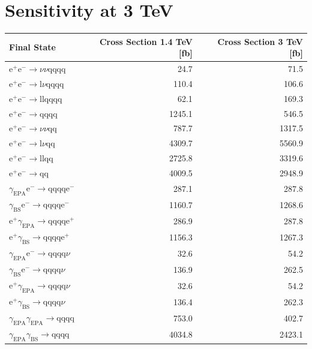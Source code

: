 \section{Sensitivity at 3 TeV}

\begin{table}[h!]
\centering
\begin{tabular}{ l r r }
\hline
Final State & Cross Section 1.4 TeV [fb] & Cross Section 3 TeV [fb]  \\ 
\hline
$\text{e}^{+}\text{e}^{-} \rightarrow \nu{\nu}\text{qqqq}$ & 24.7 & 71.5 \\
$\text{e}^{+}\text{e}^{-} \rightarrow \text{l}\nu\text{qqqq}$ & 110.4 & 106.6 \\
$\text{e}^{+}\text{e}^{-} \rightarrow \text{llqqqq}$ & 62.1 & 169.3 \\
$\text{e}^{+}\text{e}^{-} \rightarrow \text{qqqq}$ & 1245.1 & 546.5 \\
$\text{e}^{+}\text{e}^{-} \rightarrow \nu{\nu}\text{qq}$ & 787.7 & 1317.5 \\
$\text{e}^{+}\text{e}^{-} \rightarrow \text{l}\nu\text{qq}$ & 4309.7 & 5560.9 \\
$\text{e}^{+}\text{e}^{-} \rightarrow \text{llqq}$ & 2725.8 & 3319.6 \\
$\text{e}^{+}\text{e}^{-} \rightarrow \text{qq}$ & 4009.5 & 2948.9 \\
$\gamma_{\text{EPA}}\text{e}^{-} \rightarrow \text{qqqq}\text{e}^{-}$ & 287.1 & 287.8 \\
$\gamma_{\text{BS}}\text{e}^{-} \rightarrow \text{qqqq}\text{e}^{-}$ & 1160.7 & 1268.6 \\
$\text{e}^{+}\gamma_{\text{EPA}} \rightarrow \text{qqqq}\text{e}^{+}$ & 286.9 & 287.8 \\
$\text{e}^{+}\gamma_{\text{BS}} \rightarrow \text{qqqq}\text{e}^{+}$ & 1156.3 & 1267.3 \\
$\gamma_{\text{EPA}}\text{e}^{-} \rightarrow \text{qqqq}\nu$ & 32.6 & 54.2 \\
$\gamma_{\text{BS}}\text{e}^{-} \rightarrow \text{qqqq}\nu$ & 136.9 & 262.5 \\
$\text{e}^{+}\gamma_{\text{EPA}} \rightarrow \text{qqqq}\nu$ & 32.6 & 54.2 \\
$\text{e}^{+}\gamma_{\text{BS}} \rightarrow \text{qqqq}\nu$ & 136.4 & 262.3 \\
$\gamma_{\text{EPA}}\gamma_{\text{EPA}} \rightarrow \text{qqqq}$ & 753.0 & 402.7 \\
$\gamma_{\text{EPA}}\gamma_{\text{BS}} \rightarrow \text{qqqq}$ & 4034.8 & 2423.1 \\

\end{tabular}
\end{table}
